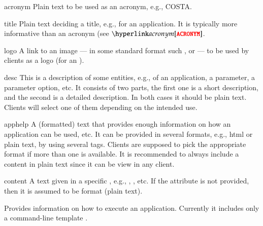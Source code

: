 \bigskip
\xmlstruct
{acronym}
{%
%
  Plain text to be used as an acronym, e.g., COSTA.
%
}
{}%


\bigskip
\xmlstruct
{title}
{%
%
  Plain text deciding a title, e.g., for an application. It is
  typically more informative than an acronym (see
  $\xmlstructref{acronym}$.
%
}
{}%


\bigskip
\xmlstruct
{logo}
{%
%
  A link to an image --- in some standard format such
  ,  or 
  --- to be used by clients as a logo (for an \app). 
%
}
{}%


\bigskip
\xmlstruct
{desc}
{%
%
  This is a description of some entities, e.g., of an application, a
  parameter, a parameter option, etc. It consists of two parts, the
  first one is a short description, and the second is a detailed
  description. In both cases it should be plain text. Clients will
  select one of them depending on the intended use.
%
}
{}%


\bigskip
\xmlstruct
{apphelp}
{%
%
  A (formatted) text that provides enough information on how an
  application can be used, etc. It can be provided in several formats,
  e.g., html or plain text, by using several 
  tags. Clients are supposed to pick the appropriate format if more
  than one is available. It is recommended to always include a content
  in plain text since it can be view in any client.
%
}
{}%


\bigskip
\xmlstruct
{content}
{%
%
  A text given in a specific , e.g.,
  , , etc. If the
  attribute  is not provided, then it is assumed
  to be  format (plain text).
%
}
{}%

\bigskip
{}
{%
%
  Provides information on how to execute an application. Currently it
  includes only a command-line template .
%
}
{}%


